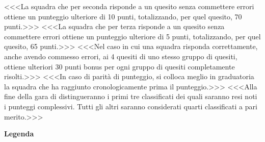 \documentclass[12pt]{mcquiz}
\def\-#1{\qst <<<#1>>>}
\def\sec#1{\par{\bf\large#1}\par}
\begin{document}
\-{La squadra che per seconda risponde a un quesito senza commettere errori ottiene un punteggio ulteriore di 10 punti, totalizzando, per quel quesito, 70 punti.}
\-{La squadra che per terza risponde a un quesito senza commettere errori ottiene un punteggio ulteriore di 5 punti, totalizzando, per quel quesito, 65 punti.}
\-{Nel caso in cui una squadra risponda correttamente, anche avendo commesso errori, ai 4 quesiti di uno stesso gruppo di quesiti, ottiene ulteriori 30 punti bonus per ogni gruppo di quesiti completamente risolti.}
\-{In caso di parità di punteggio, si colloca meglio in graduatoria la squadra che ha raggiunto cronologicamente prima il punteggio.}
\-{Alla fine della gara di distingueranno i primi tre classificati dei quali saranno resi noti i punteggi complessivi. Tutti gli altri saranno considerati quarti classificati a pari merito.}
\sec{Legenda}
\end{document}
